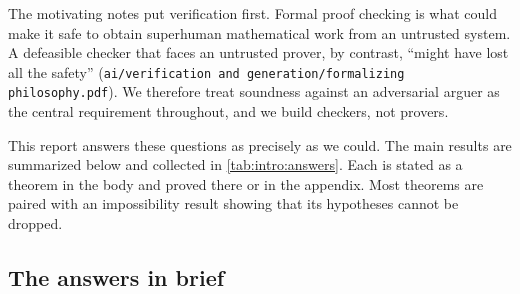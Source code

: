 The motivating notes put verification first. Formal proof checking is what could make it safe to obtain superhuman mathematical work from an untrusted system. A defeasible checker that faces an untrusted prover, by contrast, ``might have lost all the safety'' (\texttt{ai/verification and generation/formalizing philosophy.pdf}). We therefore treat soundness against an adversarial arguer as the central requirement throughout, and we build checkers, not provers.

This report answers these questions as precisely as we could. The main results are summarized below and collected in \cref{tab:intro:answers}. Each is stated as a theorem in the body and proved there or in the appendix. Most theorems are paired with an impossibility result showing that its hypotheses cannot be dropped.

\subsection{The answers in brief}\label{sec:intro:answers}


